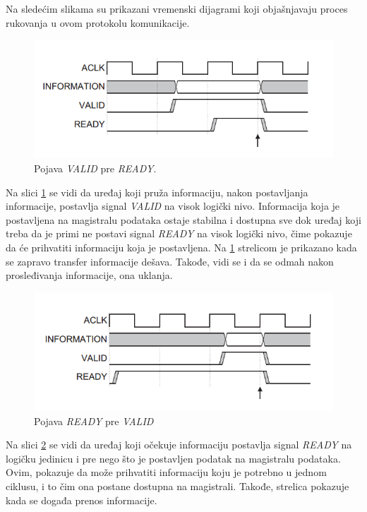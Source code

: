 \documentclass[a4paper, 12pt, diplomski]{etf}
\begin{document}
	Na sledećim slikama su prikazani vremenski dijagrami koji objašnjavaju proces rukovanja u ovom protokolu komunikacije.

	\begin{figure}[htb]
		\centering
		\includegraphics[width=.7\textwidth]{images/axi1handshake.png}
		\caption{Pojava \textit{VALID} pre \textit{READY}. \cite{lit4}}
		\label{fig:axi1hand}
	\end{figure}

	Na slici \ref{fig:axi1hand} se vidi da uređaj koji pruža informaciju, nakon postavljanja informacije, postavlja signal \textit{VALID} na visok logički nivo. Informacija koja je postavljena na magistralu podataka ostaje stabilna i dostupna sve dok uređaj koji treba da je primi ne postavi signal \textit{READY} na visok logički nivo, čime pokazuje da će prihvatiti informaciju koja je postavljena. Na \ref{fig:axi1hand} strelicom je prikazano kada se zapravo transfer informacije dešava. Takođe, vidi se i da se odmah nakon prosleđivanja informacije, ona uklanja.

	\begin{figure}[htb]
		\centering
		\includegraphics[width=.7\textwidth]{images/axi2handshake.png}
		\caption{Pojava \textit{READY} pre \textit{VALID} \cite{lit4}}
		\label{fig:axi2hand}
	\end{figure}

	Na slici \ref{fig:axi2hand} se vidi da uređaj koji očekuje informaciju postavlja signal \textit{READY} na logičku jedinicu i pre nego što je postavljen podatak na magistralu podataka. Ovim,  pokazuje da može prihvatiti informaciju koju je potrebno u jednom ciklusu, i to čim ona postane dostupna na magistrali. Takođe, strelica pokazuje kada se događa prenos informacije.
\end{document}
